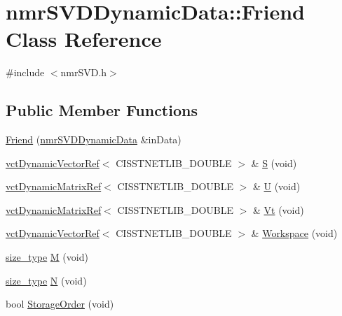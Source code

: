 \hypertarget{classnmr_s_v_d_dynamic_data_1_1_friend}{}\section{nmr\+S\+V\+D\+Dynamic\+Data\+:\+:Friend Class Reference}
\label{classnmr_s_v_d_dynamic_data_1_1_friend}


{\ttfamily \#include $<$nmr\+S\+V\+D.\+h$>$}

\subsection*{Public Member Functions}
\begin{DoxyCompactItemize}
\item 
\hyperlink{classnmr_s_v_d_dynamic_data_1_1_friend_af1b7405daba9b87fdae4a2f6edc3b1c2}{Friend} (\hyperlink{classnmr_s_v_d_dynamic_data}{nmr\+S\+V\+D\+Dynamic\+Data} \&in\+Data)
\item 
\hyperlink{classvct_dynamic_vector_ref}{vct\+Dynamic\+Vector\+Ref}$<$ C\+I\+S\+S\+T\+N\+E\+T\+L\+I\+B\+\_\+\+D\+O\+U\+B\+L\+E $>$ \& \hyperlink{classnmr_s_v_d_dynamic_data_1_1_friend_a0fe1a08405dd6bfc2a0ea5fd846fa04e}{S} (void)
\item 
\hyperlink{classvct_dynamic_matrix_ref}{vct\+Dynamic\+Matrix\+Ref}$<$ C\+I\+S\+S\+T\+N\+E\+T\+L\+I\+B\+\_\+\+D\+O\+U\+B\+L\+E $>$ \& \hyperlink{classnmr_s_v_d_dynamic_data_1_1_friend_a45d6531b7a9a956fa988fbcf8cf31c2a}{U} (void)
\item 
\hyperlink{classvct_dynamic_matrix_ref}{vct\+Dynamic\+Matrix\+Ref}$<$ C\+I\+S\+S\+T\+N\+E\+T\+L\+I\+B\+\_\+\+D\+O\+U\+B\+L\+E $>$ \& \hyperlink{classnmr_s_v_d_dynamic_data_1_1_friend_a4f42fa9246f934c17b192b72fc7b17aa}{Vt} (void)
\item 
\hyperlink{classvct_dynamic_vector_ref}{vct\+Dynamic\+Vector\+Ref}$<$ C\+I\+S\+S\+T\+N\+E\+T\+L\+I\+B\+\_\+\+D\+O\+U\+B\+L\+E $>$ \& \hyperlink{classnmr_s_v_d_dynamic_data_1_1_friend_afd614743b4f0fa86d7ced1516b692000}{Workspace} (void)
\item 
\hyperlink{classnmr_s_v_d_dynamic_data_ae1d183124f1fe39da05af9cea168101d}{size\+\_\+type} \hyperlink{classnmr_s_v_d_dynamic_data_1_1_friend_aa5b53529a48a7e34ad292e1815ea06e4}{M} (void)
\item 
\hyperlink{classnmr_s_v_d_dynamic_data_ae1d183124f1fe39da05af9cea168101d}{size\+\_\+type} \hyperlink{classnmr_s_v_d_dynamic_data_1_1_friend_a5e26ec234bd61577d388f52793d1337c}{N} (void)
\item 
bool \hyperlink{classnmr_s_v_d_dynamic_data_1_1_friend_a5d07c0dd95ca7210924545be4a2d7c5d}{Storage\+Order} (void)
\end{DoxyCompactItemize}


